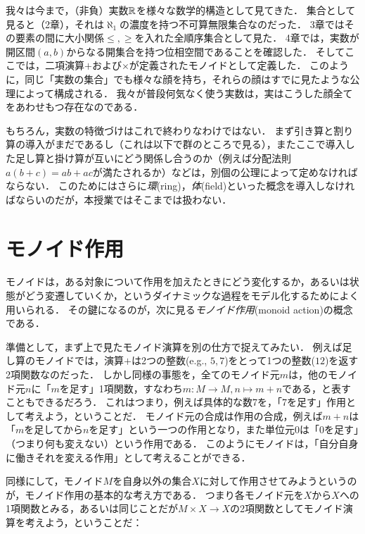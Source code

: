 \documentclass[11pt,a4paper]{jsarticle}
\begin{document}
\begin{develop}
我々は今まで，（非負）実数$\mathbb{R}$を様々な数学的構造として見てきた．
集合として見ると（2章），それは$\aleph_1$の濃度を持つ不可算無限集合なのだった．
3章ではその要素の間に大小関係$\leq, \geq$を入れた全順序集合として見た．
4章では，実数が開区間$(a,b)$からなる開集合を持つ位相空間であることを確認した．
そしてここでは，二項演算$+$および$\times$が定義されたモノイドとして定義した．
このように，同じ「実数の集合」でも様々な顔を持ち，それらの顔はすでに見たような公理によって構成される．
我々が普段何気なく使う実数は，実はこうした顔全てをあわせもつ存在なのである．

 もちろん，実数の特徴づけはこれで終わりなわけではない．
 まず引き算と割り算の導入がまだであるし（これは以下で群のところで見る），またここで導入した足し算と掛け算が互いにどう関係し合うのか（例えば分配法則$a(b+c) = ab + ac$が満たされるか）などは，別個の公理によって定めなければならない．
 このためにはさらに\emph{環}(ring)，\emph{体}(field)といった概念を導入しなければならいのだが，本授業ではそこまでは扱わない．
\end{develop}


\section{モノイド作用}
モノイドは，ある対象について作用を加えたときにどう変化するか，あるいは状態がどう変遷していくか，というダイナミックな過程をモデル化するためによく用いられる．
その鍵になるのが，次に見る\emph{モノイド作用}(monoid action)の概念である．

準備として，まず上で見たモノイド演算を別の仕方で捉えてみたい．
例えば足し算のモノイドでは，演算$+$は2つの整数(e.g., $5, 7$)をとって1つの整数($12$)を返す2項関数なのだった．
しかし同様の事態を，全てのモノイド元$m$は，他のモノイド元$n$に「$m$を足す」1項関数，すなわち$m:M \to M, n \mapsto m+n$である，と表すこともできるだろう．
これはつまり，例えば具体的な数7を，「7を足す」作用として考えよう，ということだ．
モノイド元の合成は作用の合成，例えば$m+n$は「$m$を足してから$n$を足す」という一つの作用となり，また単位元$0$は「$0$を足す」（つまり何も変えない）という作用である．
このようにモノイドは，「自分自身に働きそれを変える作用」として考えることができる．

同様にして，モノイド$M$を自身以外の集合$X$に対して作用させてみようというのが，モノイド作用の基本的な考え方である．
つまり各モノイド元を$X$から$X$への1項関数とみる，あるいは同じことだが$M \times X \to X$の2項関数としてモノイド演算を考えよう，ということだ：
\end{document}
